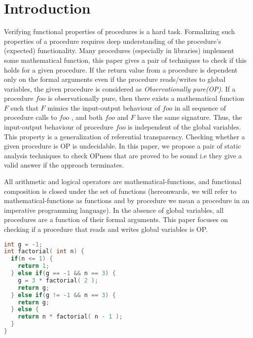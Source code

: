 \documentclass{llncs}
\newcommand{\foo}{\textit{foo}}
\newcommand{\F}{\mathit{F}}
\begin{document}
\section{Introduction}
Verifying functional properties of procedures is a hard task.
Formalizing such properties of a procedure requires deep understanding
of the procedure's (expected) functionality. Many procedures
(especially in libraries) implement some mathematical function, this
paper gives a pair of techniques to check if this holds for a given
procedure. If the return value from a procedure is dependent only on
the formal arguments even if the procedure reads/writes to global
variables, the given procedure is considered as
\textit{Observationally pure(OP)}.  If a procedure $\foo$ is
observationally pure, then there exists a mathematical function $\F$
such that $\F$ mimics the input-output behaviour of $\foo$ in all
sequence of procedure calls to $\foo$ , and both $\foo$ and $\F$ have
the same signature.  Thus, the input-output behaviour of procedure
$\foo$ is independent of the global variables. This property is a
generalization of referential transparency.
Checking whether a given procedure is OP is undecidable. In this
paper, we propose a pair of static analysis techniques to check OPness
that are proved to be sound i.e they give a valid answer if the
approach terminates.

All arithmetic and logical operators are mathematical-functions, and
functional composition is closed under the set of functions
(hereonwards, we will refer to mathematical-functions as functions and
by procedure we mean a procedure in an imperative programming
language).  In the absence of global variables, all procedures are a
function of their formal arguments. This paper focuses on checking if
a procedure that reads and writes global variables is OP.

\begin{lstlisting}[language=c, caption= {Procedure `factorial' :
      returns factorial of `n' and memoizes result for argument value
      `3'.}, label=lst:factorialSimple]
int g = -1;
int factorial( int n) {
  if(n <= 1) {
    return 1;
  } else if(g == -1 && n == 3) {
    g = 3 * factorial( 2 );
    return g;
  } else if(g != -1 && n == 3) {
    return g;
  } else {
    return n * factorial( n - 1 );
  }
}
\end{lstlisting}
\end{document}
